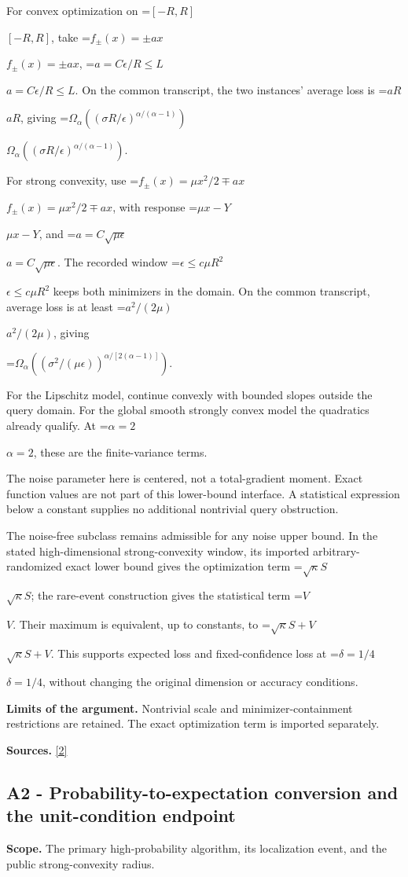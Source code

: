 \documentclass[10pt,a4paper]{article}
\newcommand{\AtlasMath}[1]{\par\begingroup\centering\setbox0=\hbox{$\displaystyle #1$}\ifdim\wd0>1.4\linewidth\typeout{ATLAS WIDE FORMULA: \the\wd0}\fi\ifdim\wd0>\linewidth\resizebox{\linewidth}{!}{\box0}\else\box0\fi\par\endgroup}
\newcommand{\AtlasInlineMath}[1]{\begingroup\setbox0=\hbox{$#1$}\ifdim\wd0>.4\linewidth\endgroup\AtlasMath{#1}\else\endgroup$#1$\fi}
\begin{document}
For convex optimization on \AtlasInlineMath{[-R,R]}, take \AtlasInlineMath{f_\pm(x)=\pm ax}, \AtlasInlineMath{a=C\epsilon/R\le L}. On the common transcript, the two instances' average loss is \AtlasInlineMath{aR}, giving
\AtlasInlineMath{\Omega_\alpha((\sigma R/\epsilon)^{\alpha/(\alpha-1)})}.

For strong convexity, use \AtlasInlineMath{f_\pm(x)=\mu x^2/2\mp ax}, with response \AtlasInlineMath{\mu x-Y}, and \AtlasInlineMath{a=C\sqrt{\mu\epsilon}}. The recorded window \AtlasInlineMath{\epsilon\le c\mu R^2} keeps both minimizers in the domain. On the common transcript, average loss is at least \AtlasInlineMath{a^2/(2\mu)}, giving

\AtlasMath{\Omega_\alpha((\sigma^2/(\mu\epsilon))^{\alpha/[2(\alpha-1)]}).}

For the Lipschitz model, continue convexly with bounded slopes outside the query domain. For the global smooth strongly convex model the quadratics already qualify. At \AtlasInlineMath{\alpha=2}, these are the finite-variance terms.

The noise parameter here is centered, not a total-gradient moment. Exact function values are not part of this lower-bound interface. A statistical expression below a constant supplies no additional nontrivial query obstruction.

The noise-free subclass remains admissible for any noise upper bound. In the stated high-dimensional strong-convexity window, its imported arbitrary-randomized exact lower bound gives the optimization term \AtlasInlineMath{\sqrt\kappa S}; the rare-event construction gives the statistical term \AtlasInlineMath{V}. Their maximum is equivalent, up to constants, to \AtlasInlineMath{\sqrt\kappa S+V}. This supports expected loss and fixed-confidence loss at \AtlasInlineMath{\delta=1/4}, without changing the original dimension or accuracy conditions.

\textbf{Limits of the argument.} Nontrivial scale and minimizer-containment restrictions are retained. The exact optimization term is imported separately.

\textbf{Sources.} \href{https://arxiv.org/pdf/2609.10874}{[2]}

\subsection{A2 - Probability-to-expectation conversion and the unit-condition endpoint}
\textbf{Scope.} The primary high-probability algorithm, its localization event, and the public strong-convexity radius.
\end{document}
